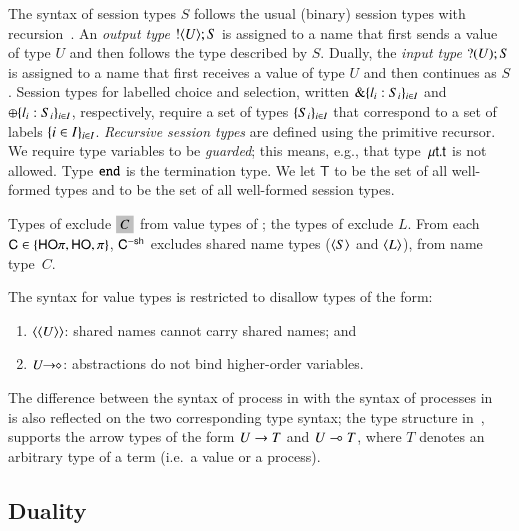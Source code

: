 The syntax of session types $S$ follows the usual
(binary) session types with
recursion~\cite{honda.vasconcelos.kubo:language-primitives,GH05}.
An {\em output type} $! \langle U \rangle ; S$ is assigned to a name that
first sends a value of type $U$ and then follows
the type described by $S$.
Dually, the {\em input type} $? (U) ; S$ is assigned to a name
that first receives a value of type $U$ and then continues as $S$. 
Session types for labelled choice and selection, 
written $\& \{l_i:S_i\}_{i \in I}$ and $\oplus \{l_i:S_i\}_{i \in I}$, respectively,
require a set of types $\{S_i\}_{i \in I}$ that correspond to a set of
labels $\{i \in I\}_{i \in I}$. 
{\em Recursive session types} are defined using the primitive recursor.
We require type variables to be \emph{guarded}; this means, e.g., that type~$\mu\mathsf{t}.\mathsf{t}$ is not allowed.
Type $\mathtt{end}$ is the termination type.
We let $\mathsf{T}$ to be the set of all well-formed types and
\ST to be the set of all well-formed session types.

Types of \HO exclude $\nonhosyntax{C}$ from 
value types of \HOp; the types of \sessp exclude $L$. 
From each $\mathsf{C} \in \{\mathsf{HO}\pi, \mathsf{HO}, \pi \}$, $\mathsf{C}^{-\mathsf{sh}}$ 
excludes shared name types ($\langle S \rangle$ and $\langle L \rangle$), 
from name type~$C$.


\begin{remark}
	The syntax for value types is restricted
	to disallow types of the form:
	\begin{enumerate}[$\bullet$]
		\item	$\langle \langle U \rangle \rangle$: shared names
			cannot carry shared names; and

		\item  $U\!\! \rightarrow\!\! \diamond$: abstractions do not
			bind higher-order variables.
	\end{enumerate}
\end{remark}

The difference between the syntax of process
in \HOp with the syntax of processes in~\cite{tlca07,MostrousY15}
is also reflected on the two corresponding type syntax;
the type structure  in~\cite{tlca07,MostrousY15}, 
supports the arrow types of the form $U \rightarrow T$ and 
$U \multimap T$, where $T$ denotes an arbitrary type of a term 
(i.e.~a value or a process).


\subsection{Duality}

